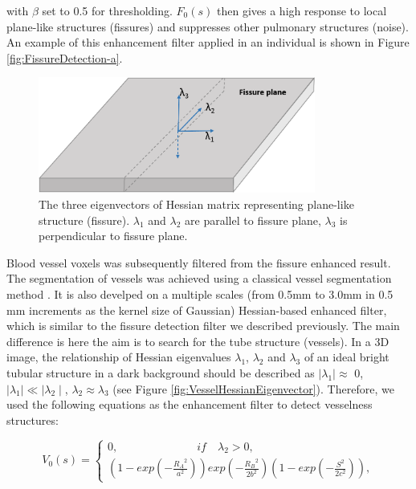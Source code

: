 {\noindent with $\beta$ set to 0.5 for thresholding. $F_0(s)$ then gives a high response to local plane-like structures (fissures) and suppresses other pulmonary structures (noise). An example of this enhancement filter applied in an individual is shown in Figure \ref{fig:FissureDetection-a}. 

\begin{figure}[htbp]
  \centering 
	\vspace{.15in} %
  \includegraphics[height=1.5in]{Segmentation/Image/FissureHessianEigenvector.png}
  \caption{The three eigenvectors of Hessian matrix representing plane-like structure (fissure). $\lambda_1$ and $\lambda_2$ are parallel to fissure plane, $\lambda_3$ is perpendicular to fissure plane.}
  \label{fig:FissureHessianEigenvector}
\end{figure}

Blood vessel voxels was subsequently filtered from the fissure enhanced result. The segmentation of vessels was achieved using a classical vessel segmentation method \citep{frangi1998multiscale}. It is also develped on a multiple scales (from 0.5mm to 3.0mm in 0.5 mm increments as the kernel size of Gaussian) Hessian-based enhanced filter, which is similar to the fissure detection filter we described previously. The main difference is here the aim is to search for the tube structure (vessels). In a 3D image,  the relationship of Hessian eigenvalues $\lambda_{1}$, $\lambda_{2}$ and $\lambda_{3}$ of an ideal bright tubular structure in a dark background should be described as $\mid\lambda_{1}\mid\approx$ 0, $\mid\lambda_{1}\mid\ll\mid\lambda_{2}\mid$,  $\lambda_{2}\approx\lambda_{3}$ (see Figure \ref{fig:VesselHessianEigenvector}). Therefore, we used the following equations as the enhancement filter to detect vesselness structures:

\begin{equation}
\label{eq:VesselHessian1}
V_0(s) = \begin{cases}
         0,\quad\quad\quad\quad\quad\quad\quad if \quad \lambda_{2}>0,\\
         (1-exp(-\frac{{R_A}^2}{a^2}))exp(-\frac{{R_B}^2}{2b^2})(1-exp(-\frac{S^2}{2c^2})),
         \end{cases}
\end{equation}

}
